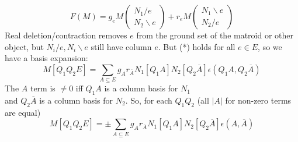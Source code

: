 \documentclass{beamer}
\begin{document}
\begin{frame}
    \[
  F(M) =
  g_eM\left(\begin{array}{c} N_1/e\\ N_2\backslash e \end{array} \right)
+
r_eM\left(\begin{array}{c} N_1\backslash e\\ N_2/e \end{array} \right)
\]
Real deletion/contraction removes $e$ from the ground set of the matroid or other
object, but $N_i/e,N_i\backslash e$ still have column $e$.  But (*) holds for all $e\in E$, so
we have a basis expansion:
\[
M[Q_1Q_2E] = \sum_{A\subseteq E}g_Ar_{\overline{A}}N_1[Q_1A]N_2[Q_2\overline{A}]
\epsilon(Q_1A,Q_2\overline{A})
\]
The $A$ term is $\neq 0$ iff $Q_1A$ is a column basis for $N_1$\\
and $Q_2\overline{A}$ is a column basis for $N_2$.
So, for each $Q_1Q_2$ (all $|A|$ for non-zero terms are equal)
\[
M[Q_1Q_2E] = \pm\sum_{A\subseteq E}g_Ar_{\overline{A}}N_1[Q_1A]N_2[Q_2\overline{A}]
\epsilon(A,\overline{A})
\]


\end{frame}
\end{document}
